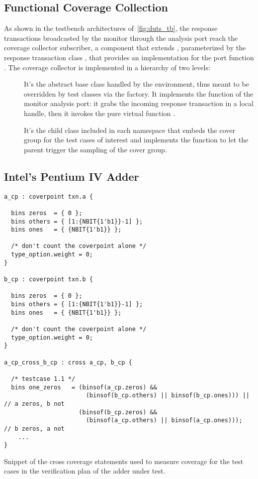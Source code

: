 \subsection{Functional Coverage Collection}\label{subsec:func_cov}
As shown in the testbench architectures of~\cref{fig:duts_tb}, the response transactions broadcasted by the monitor through the analysis port reach the coverage collector subscriber, a component that extends , parameterized by the response transaction class , that provides an implementation for the port function . The coverage collector is implemented in a hierarchy of two levels:
\begin{description}
    \item[] It's the abstract base class handled by the environment, thus meant to be overridden by test classes via the factory. It implements the  function of the monitor analysis port: it grabs the incoming response transaction in a local handle, then it invokes the pure virtual function .
    
    \item[] It's the child class included in each \dut namespace that embeds the cover group for the test cases of interest and implements the  function to let the parent trigger the sampling of the cover group.
\end{description}

\subsection{Intel's Pentium IV Adder}\label{subsec:vplan-p4}

\begin{listing}
\begin{verbatim}
a_cp : coverpoint txn.a {

  bins zeros  = { 0 };
  bins others = { [1:{NBIT{1'b1}}-1] };
  bins ones   = { {NBIT{1'b1}} };

  /* don't count the coverpoint alone */
  type_option.weight = 0;
}

b_cp : coverpoint txn.b {

  bins zeros  = { 0 };
  bins others = { [1:{NBIT{1'b1}}-1] };
  bins ones   = { {NBIT{1'b1}} };

  /* don't count the coverpoint alone */
  type_option.weight = 0;
}

a_cp_cross_b_cp : cross a_cp, b_cp {

  /* testcase 1.1 */
  bins one_zeros   = (binsof(a_cp.zeros) &&
                       (binsof(b_cp.others) || binsof(b_cp.ones))) || // a zeros, b not
                     (binsof(b_cp.zeros) &&
                       (binsof(a_cp.others) || binsof(a_cp.ones)));   // b zeros, a not
    ...
}
\end{verbatim}
\caption{Snippet of the cross coverage statements used to measure coverage for the test cases in the verification plan of the adder under test.}
\label{list:xcov_ab}
\end{listing}

